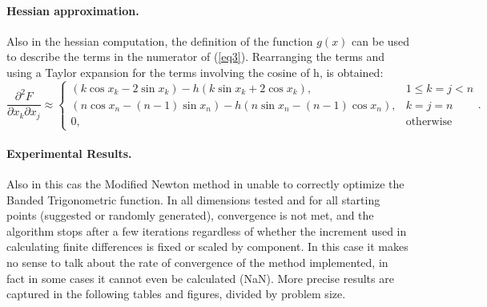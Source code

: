\documentclass[a4paper,12pt]{article}
\begin{document}
	\paragraph{Hessian approximation.}
	Also in the hessian computation, the definition of the function $g(x)$ can be used to describe the terms in the numerator of (\ref{eq3}). Rearranging the terms and using a Taylor expansion for the terms involving the cosine of h, is obtained:
	\begin{equation}
		\frac{\partial^2 F}{\partial x_k \partial x_j} \approx
		\begin{cases}
			(k \cos x_k - 2 \sin x_k) - h(k\sin x_k + 2 \cos x_k) , & 1 \leq k = j < n \\
			(n \cos x_n - (n-1) \sin x_n) - h(n\sin x_n -(n-1) \cos x_n), & k = j = n \\
			0, & \text{otherwise}
		\end{cases}.
	\end{equation}
	
	
	\vspace{1em}
	\newpage
	\paragraph{Experimental Results.}
	Also in this cas the Modified Newton method in unable to correctly optimize the Banded Trigonometric function. In all dimensions tested and for all starting points (suggested or randomly generated),  convergence is not met, and the algorithm stops after a few iterations regardless of whether the increment used in calculating finite differences is fixed or scaled by component. In this case it makes no sense to talk about the rate of convergence of the method implemented, in fact in some cases it cannot even be calculated (NaN). More precise results are captured in the following tables and figures, divided by problem size. 
	
\end{document}
